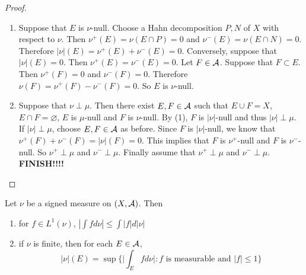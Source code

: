 \documentclass{book}
\begin{document}
	\begin{proof}
		\begin{enumerate}
			\item Suppose that $E$ is $\nu$-null. Choose a Hahn decomposition $P,N$ of $X$ with respect to $\nu$. Then $\nu^+(E) = \nu(E \cap P) = 0$ and $\nu^-(E) = \nu(E \cap N) = 0$. Therefore $|\nu|(E) = \nu^+(E) + \nu^-(E) = 0$. Conversely, suppose that $|\nu|(E) = 0$. Then $\nu^+(E) = \nu^-(E) = 0$. Let $F \in \mathcal{A}$. Suppose that $F \subset E$. Then $\nu^+(F) = 0$ and $\nu^-(F) = 0$. Therefore $\nu(F) = \nu^+(F) - \nu^-(F) = 0$. So $E$ is $\nu$-null.
			
			\item Suppose that $\nu \perp \mu$. Then there exist $E,F \in \mathcal{A}$ such that $E \cup F = X$, $E \cap F = \varnothing$, $E$ is $\mu$-null and $F$ is $\nu$-null. By (1), $F$ is $|\nu|$-null and thus $|\nu| \perp \mu$. If $|\nu| \perp \mu$, choose $E,F \in \mathcal{A}$ as before. Since $F$ is $|\nu|$-null, we know that $\nu^+(F) + \nu^-(F) = |\nu|(F) = 0$. This implies that $F$ is $\nu^+$-null and $F$ is $\nu^-$-null. So $\nu^+ \perp \mu$ and $\nu^- \perp \mu$. Finally assume that $\nu^+ \perp \mu$ and $\nu^- \perp \mu$. \textbf{FINISH!!!!}
			
		\end{enumerate}
	\end{proof}
	
	\begin{ex}  
		Let $\nu$ be a signed measure on $(X, \mathcal{A})$. Then 
		\begin{enumerate}
			\item for $f \in L^1(\nu)$, $|\int f d \nu| \leq \int |f| d |\nu|$
			\item if $\nu$ is finite, then for each $E \in \mathcal{A}$, $$|\nu|(E) = \sup \bigg\{\bigg|\int_E f d \nu \bigg|: f  \text{ is measurable and } |f| \leq 1 \bigg \}$$
		\end{enumerate}
	\end{ex}
	
\end{document}
